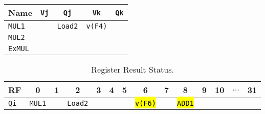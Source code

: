 \begin{enumerate}
    \begin{table}[!htp]
        \centering
        \begin{tabular}{@{} l | c c c c @{}}
            \toprule
            Name            & \texttt{Vj}   & \texttt{Qj}           & \texttt{Vk}           & \texttt{Qk}   \\
            \midrule
            \texttt{MUL1}   &               & \texttt{Load2}        & \texttt{v(F4)}        &               \\ [.3em]
            \texttt{MUL2}   &               &                       &                       &               \\
            \cmidrule{1-5}
            \texttt{ExMUL}  &               &                       &                       &               \\
            \bottomrule
        \end{tabular}
    \end{table}

    \begin{table}[!htp]
        \centering
        \begin{tabular}{@{} l | c c c c c c c c c c c c c @{}}
            \toprule
            RF              & 0                     & 1             & 2                     & 3             & 4             & 5             & 6                     & 7             & 8                     & 9             & 10            & $\dots$           & 31            \\
            \midrule
            \texttt{Qi}     & \texttt{MUL1}         &               & \texttt{Load2}        &               &               &               & \hl{\texttt{v(F6)}}   &               & \hl{\texttt{ADD1}}    &               &               &                   &               \\
            \bottomrule
        \end{tabular}
        \caption*{Register Result Status.}
    \end{table}

    \newpage



\end{enumerate}
